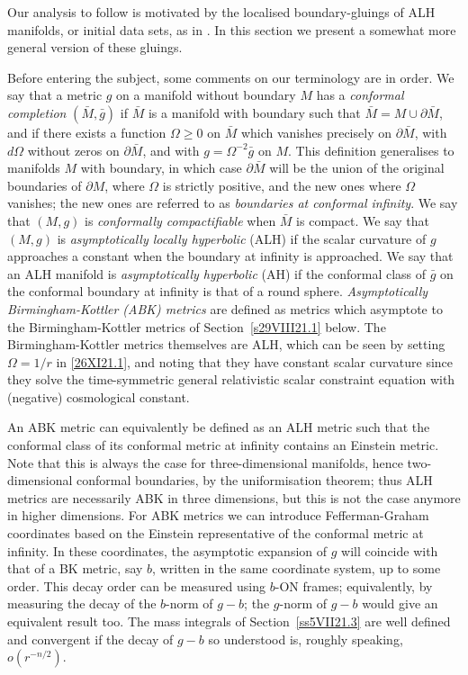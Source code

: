 \documentclass[a4paper,10pt]{article}
\newcommand{\red}[1]{{\color{red}#1}}
\renewcommand{\red}[1]{#1}%
\begin{document}
      Our analysis to follow is motivated by
      the localised boundary-gluings
      of \red{ALH} manifolds, or initial data sets, as in
      \cite[Section~3.5]{ChDelayExotic}. In this section we present a somewhat more general version of
      these gluings.


       Before entering the subject, some comments on our terminology are in order. We  say that a metric $g$ on a manifold without boundary $M$ has a \emph{conformal completion} $(\bar M, \bar g)$  if $\bar M$ is a manifold with boundary such that  $\bar M= M \cup \partial \bar M$, and if
      there exists a function $\Omega\ge 0$ on $\bar M$ which vanishes precisely on $\partial \bar M$, with $d\Omega$ without zeros on $\partial \bar M$, and with $g=\Omega^{-2} \bar g$ on $M$.
      This definition generalises to manifolds $M$ with boundary, in which case $\partial \bar M$ will be the union of the original boundaries of $\partial M$, where $\Omega $ is strictly positive, and the new ones where $\Omega $ vanishes; the new ones are referred to as \emph{boundaries at conformal infinity}. We   say that $(M,g)$ is \emph{conformally compactifiable}  when $\bar M$ is compact. We say that $(M,g)$ is \emph{asymptotically locally hyperbolic}  (ALH) if the scalar curvature of $g$ approaches a constant when the boundary at infinity is approached. We say that an ALH manifold is \emph{asymptotically hyperbolic} (AH) if the conformal class of $\bar g$ on the conformal boundary at infinity is that of a round sphere. \emph{Asymptotically Birmingham-Kottler (ABK) metrics} are defined as  metrics which asymptote to the Birmingham-Kottler metrics of Section~\ref{s29VIII21.1} below. The Birmingham-Kottler metrics themselves are ALH, which can be seen by setting  $\Omega= 1/r$ in \eqref{26XI21.1}, and noting that they have constant scalar curvature since they solve the time-symmetric general relativistic scalar constraint equation with (negative) cosmological constant.



      An ABK metric can equivalently be defined as an ALH metric such that the conformal class of its conformal metric at infinity contains an Einstein metric. Note that this is always the case for three-dimensional manifolds, hence two-dimensional conformal boundaries, by the uniformisation theorem; thus ALH metrics are necessarily ABK in three dimensions, but this is not the case anymore in higher dimensions. For ABK metrics we can introduce Fefferman-Graham coordinates based on the Einstein representative of the conformal metric at infinity. In these coordinates, the asymptotic expansion of $g$ will coincide with that of a BK metric, say $b$, written in the same coordinate system, up to some order.
      This decay order can be measured using $b$-ON frames; equivalently, by measuring the decay of the $b$-norm of $g-b$; the $g$-norm  of $g-b$ would give an equivalent result too. The mass integrals of Section~\ref{ss5VII21.3}  are well defined and convergent if the decay of $g-b$ so understood is,  roughly speaking, $o(r^{-n/2})$.
\end{document}
